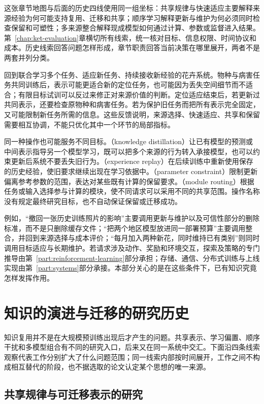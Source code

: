 这张章节地图与后面的历史四线使用同一组坐标：共享规律与快速适应主要解释来源经验为何可能支持复用、迁移和共享；顺序学习解释更新与维护为何必须同时检查保留和可塑性；多来源整合解释现成模型如何通过计算、参数或监督进入结果。第~\ref{chap:ket-evaluation}章横切所有线索，统一核对目标、信息权限、时间协议和成本。历史线索回答问题怎样形成，章节职责回答当前决策在哪里展开，两者不是两套并列分类。

回到联合学习多个任务、适应新任务、持续接收新经验的花卉系统。物种与病害任务共同训练后，表示可能更适合新的定位任务，也可能因为丢失空间细节而不适合；有限目标试训可以反过来修正对来源价值的判断。定位适应结束后，若更新过共同表示，还要检查原物种和病害任务。若为保护旧任务而把所有表示完全固定，又可能限制新任务所需的信息。这些反馈说明，来源选择、快速适应、共享和保留需要相互协调，不能只优化其中一个环节的局部指标。

同一种操作也可能服务不同目标。（knowledge distillation）让已有模型的预测或中间表示指导另一个模型学习，既可以把多个来源的行为转入承接模型，也可以约束更新后系统不要丢失旧行为。（experience replay）在后续训练中重新使用保存的历史经验，使旧要求继续出现在学习依据中。（parameter constraint）限制更新偏离参考参数的范围，表达对某些既有计算的保留要求。（module routing）根据任务或输入选择参与计算的模块，使不同请求可以采用不同的共享范围。操作名称没有规定最终研究目标，也不自动保证保留或迁移成功。

例如，“撤回一张历史训练照片的影响”主要调用更新与维护以及可信性部分的删除标准，而不是只删除缓存文件；“把两个地区模型放进同一部署预算”主要调用整合，并回到来源选择与成本评价；“每月加入两种新花，同时维持已有类别”则同时调用目标适应与长期维护。若请求涉及动作、奖励和环境交互，探索及策略的专门推导由第~\ref{part:reinforcement-learning}部分承担；存储、通信、分布式训练与上线实现由第~\ref{part:systems}部分承接。本部分关心的是在这些条件下，已有知识究竟怎样发挥作用。

\section{知识的演进与迁移的研究历史}
\label{sec:ket-overview-history}

知识复用并不是在大规模预训练出现后才产生的问题。共享表示、学习偏置、顺序干扰和多模型组合有不同的研究入口，后来又在同一系统中交汇。下面沿四条线索观察代表工作分别扩大了什么问题范围；同一线索内部按时间展开，工作之间不构成相互替代的阶段，也不据选取的论文认定某个思想的唯一来源。

\subsection{共享规律与可迁移表示的研究}
\label{sec:ket-overview-history-representation}


